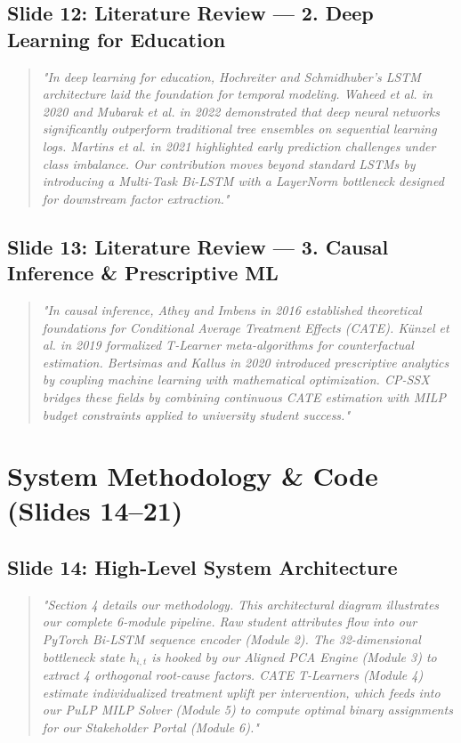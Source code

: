 \documentclass[11pt, a4paper]{article}
\begin{document}
\subsection{Slide 12: Literature Review --- 2. Deep Learning for Education}
\begin{quote}\small \itshape
"In deep learning for education, Hochreiter and Schmidhuber's LSTM architecture laid the foundation for temporal modeling. Waheed et al. in 2020 and Mubarak et al. in 2022 demonstrated that deep neural networks significantly outperform traditional tree ensembles on sequential learning logs. Martins et al. in 2021 highlighted early prediction challenges under class imbalance. Our contribution moves beyond standard LSTMs by introducing a Multi-Task Bi-LSTM with a LayerNorm bottleneck designed for downstream factor extraction."
\end{quote}

\subsection{Slide 13: Literature Review --- 3. Causal Inference \& Prescriptive ML}
\begin{quote}\small \itshape
"In causal inference, Athey and Imbens in 2016 established theoretical foundations for Conditional Average Treatment Effects (CATE). Künzel et al. in 2019 formalized T-Learner meta-algorithms for counterfactual estimation. Bertsimas and Kallus in 2020 introduced prescriptive analytics by coupling machine learning with mathematical optimization. CP-SSX bridges these fields by combining continuous CATE estimation with MILP budget constraints applied to university student success."
\end{quote}

\section{System Methodology \& Code (Slides 14--21)}

\subsection{Slide 14: High-Level System Architecture}
\begin{quote}\small \itshape
"Section 4 details our methodology. This architectural diagram illustrates our complete 6-module pipeline. Raw student attributes flow into our PyTorch Bi-LSTM sequence encoder (Module 2). The 32-dimensional bottleneck state $h_{i,t}$ is hooked by our Aligned PCA Engine (Module 3) to extract 4 orthogonal root-cause factors. CATE T-Learners (Module 4) estimate individualized treatment uplift per intervention, which feeds into our PuLP MILP Solver (Module 5) to compute optimal binary assignments for our Stakeholder Portal (Module 6)."
\end{quote}
\end{document}
